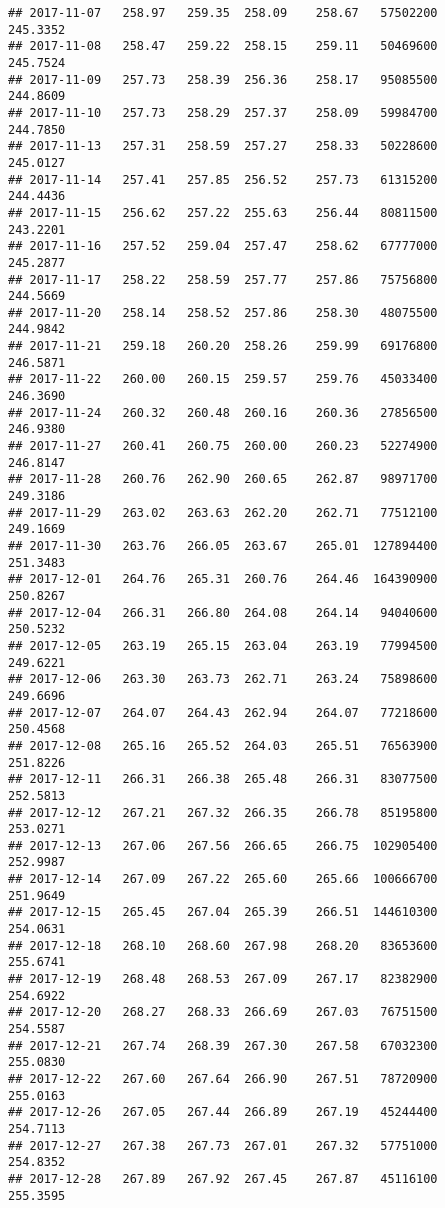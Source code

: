 \documentclass[
]{article}
\begin{document}
\begin{verbatim}
## 2017-11-07   258.97   259.35  258.09    258.67   57502200     245.3352
## 2017-11-08   258.47   259.22  258.15    259.11   50469600     245.7524
## 2017-11-09   257.73   258.39  256.36    258.17   95085500     244.8609
## 2017-11-10   257.73   258.29  257.37    258.09   59984700     244.7850
## 2017-11-13   257.31   258.59  257.27    258.33   50228600     245.0127
## 2017-11-14   257.41   257.85  256.52    257.73   61315200     244.4436
## 2017-11-15   256.62   257.22  255.63    256.44   80811500     243.2201
## 2017-11-16   257.52   259.04  257.47    258.62   67777000     245.2877
## 2017-11-17   258.22   258.59  257.77    257.86   75756800     244.5669
## 2017-11-20   258.14   258.52  257.86    258.30   48075500     244.9842
## 2017-11-21   259.18   260.20  258.26    259.99   69176800     246.5871
## 2017-11-22   260.00   260.15  259.57    259.76   45033400     246.3690
## 2017-11-24   260.32   260.48  260.16    260.36   27856500     246.9380
## 2017-11-27   260.41   260.75  260.00    260.23   52274900     246.8147
## 2017-11-28   260.76   262.90  260.65    262.87   98971700     249.3186
## 2017-11-29   263.02   263.63  262.20    262.71   77512100     249.1669
## 2017-11-30   263.76   266.05  263.67    265.01  127894400     251.3483
## 2017-12-01   264.76   265.31  260.76    264.46  164390900     250.8267
## 2017-12-04   266.31   266.80  264.08    264.14   94040600     250.5232
## 2017-12-05   263.19   265.15  263.04    263.19   77994500     249.6221
## 2017-12-06   263.30   263.73  262.71    263.24   75898600     249.6696
## 2017-12-07   264.07   264.43  262.94    264.07   77218600     250.4568
## 2017-12-08   265.16   265.52  264.03    265.51   76563900     251.8226
## 2017-12-11   266.31   266.38  265.48    266.31   83077500     252.5813
## 2017-12-12   267.21   267.32  266.35    266.78   85195800     253.0271
## 2017-12-13   267.06   267.56  266.65    266.75  102905400     252.9987
## 2017-12-14   267.09   267.22  265.60    265.66  100666700     251.9649
## 2017-12-15   265.45   267.04  265.39    266.51  144610300     254.0631
## 2017-12-18   268.10   268.60  267.98    268.20   83653600     255.6741
## 2017-12-19   268.48   268.53  267.09    267.17   82382900     254.6922
## 2017-12-20   268.27   268.33  266.69    267.03   76751500     254.5587
## 2017-12-21   267.74   268.39  267.30    267.58   67032300     255.0830
## 2017-12-22   267.60   267.64  266.90    267.51   78720900     255.0163
## 2017-12-26   267.05   267.44  266.89    267.19   45244400     254.7113
## 2017-12-27   267.38   267.73  267.01    267.32   57751000     254.8352
## 2017-12-28   267.89   267.92  267.45    267.87   45116100     255.3595

\end{verbatim}
\end{document}
